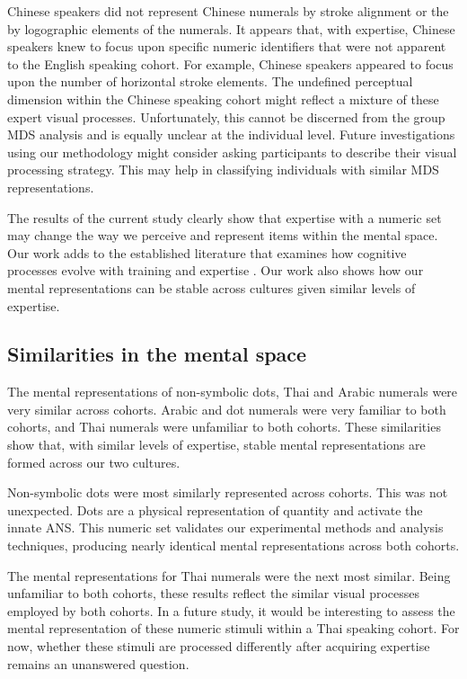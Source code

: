Chinese speakers did not represent Chinese numerals by stroke alignment or the by logographic elements of the numerals. It appears that, with expertise, Chinese speakers knew to focus upon specific numeric identifiers that were not apparent to the English speaking cohort. For example, Chinese speakers appeared to focus upon the number of horizontal stroke elements. The undefined perceptual dimension within the Chinese speaking cohort might reflect a mixture of these expert visual processes. Unfortunately, this cannot be discerned from the group MDS analysis and is equally unclear at the individual level. Future investigations using our methodology might consider asking participants to describe their visual processing strategy. This may help in classifying individuals with similar MDS representations.

The results of the current study clearly show that expertise with a numeric set may change the way we perceive and represent items within the mental space. Our work adds to the established literature that examines how cognitive processes evolve with training and expertise \cite{yeh2003role, gauthier2003perceptual, chua2019domain}. Our work also shows how our mental representations can be stable across cultures given similar levels of expertise. 

\subsection{Similarities in the mental space}
The mental representations of non-symbolic dots, Thai and Arabic numerals were very similar across cohorts. Arabic and dot numerals were very familiar to both cohorts, and Thai numerals were unfamiliar to both cohorts. These similarities show that, with similar levels of expertise, stable mental representations are formed across our two cultures. 

Non-symbolic dots were most similarly represented across cohorts. This was not unexpected. Dots are a physical representation of quantity and activate the innate ANS. This numeric set validates our experimental methods and analysis techniques, producing nearly identical mental representations across both cohorts.

The mental representations for Thai numerals were the next most similar. Being unfamiliar to both cohorts, these results reflect the similar visual processes employed by both cohorts. In a future study, it would be interesting to assess the mental representation of these numeric stimuli within a Thai speaking cohort. For now, whether these stimuli are processed differently after acquiring expertise remains an unanswered question.

